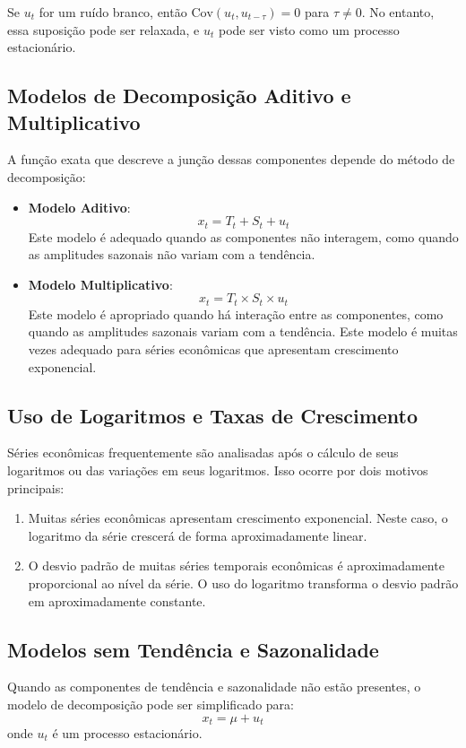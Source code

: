\documentclass{sciposter}
\begin{document}
\begin{multicols}{3}
Se $u_t$ for um ruído branco, então $\text{Cov}(u_t, u_{t-\tau}) = 0$ para $\tau \neq 0$. No entanto, essa suposição pode ser relaxada, e $u_t$ pode ser visto como um processo estacionário.

\subsection{Modelos de Decomposição Aditivo e Multiplicativo}
A função exata que descreve a junção dessas componentes depende do método de decomposição:
\begin{itemize}
    \item \textbf{Modelo Aditivo}: 
    \[
    x_t = T_t + S_t + u_t
    \]
    Este modelo é adequado quando as componentes não interagem, como quando as amplitudes sazonais não variam com a tendência.
    \item \textbf{Modelo Multiplicativo}: 
    \[
    x_t = T_t \times S_t \times u_t
    \]
    Este modelo é apropriado quando há interação entre as componentes, como quando as amplitudes sazonais variam com a tendência. Este modelo é muitas vezes adequado para séries econômicas que apresentam crescimento exponencial.
\end{itemize}

\subsection{Uso de Logaritmos e Taxas de Crescimento}
Séries econômicas frequentemente são analisadas após o cálculo de seus logaritmos ou das variações em seus logaritmos. Isso ocorre por dois motivos principais:
\begin{enumerate}
    \item Muitas séries econômicas apresentam crescimento exponencial. Neste caso, o logaritmo da série crescerá de forma aproximadamente linear.
    \item O desvio padrão de muitas séries temporais econômicas é aproximadamente proporcional ao nível da série. O uso do logaritmo transforma o desvio padrão em aproximadamente constante.
\end{enumerate}

\subsection{Modelos sem Tendência e Sazonalidade}
Quando as componentes de tendência e sazonalidade não estão presentes, o modelo de decomposição pode ser simplificado para:
\[
x_t = \mu + u_t
\]
onde $u_t$ é um processo estacionário.


\end{multicols}
\end{document}
